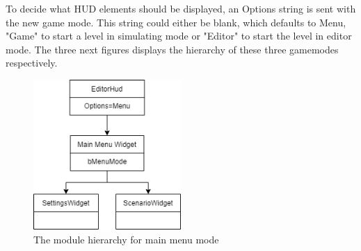 To decide what HUD elements should be displayed, an Options string is sent with the new game mode. This string could either be blank, which defaults to Menu, "Game" to start a level in simulating mode or "Editor" to start the level in editor mode. The three next figures displays the hierarchy of these three gamemodes respectively.
\begin{figure}[H]
    \centerline{\includegraphics[width=0.5\textwidth]{figures/Untitled Diagram-Main Menu.drawio.png}}
    \caption[Hierarchy of application start up functionality ]{The module hierarchy for main menu mode }
    \label{fig::menu_hierarcy}
\end{figure} 

